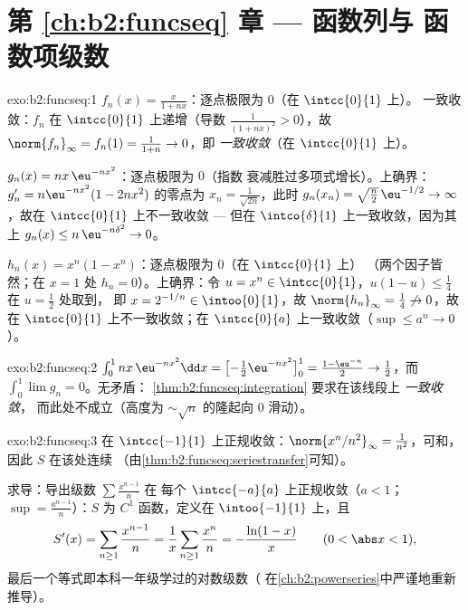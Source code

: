 \section*{第 \ref{ch:b2:funcseq} 章 --- 函数列与
函数项级数}

\begin{solution}{exo:b2:funcseq:1}
$f_n(x) = \frac{x}{1 + nx}$：逐点极限为 $0$（在 $\intcc{0}{1}$ 上）。
一致收敛：$f_n$ 在 $\intcc{0}{1}$ 上递增（导数
$\frac{1}{(1+nx)^2} > 0$），故 $\norm{f_n}_\infty = f_n(1) =
\frac{1}{1+n} \to 0$，即 \emph{一致收敛}（在 $\intcc{0}{1}$ 上）。

$g_n(x) = nx\,\eu^{-nx^2}$：逐点极限为 $0$（指数
衰减胜过多项式增长）。上确界：$g_n' = n\eu^{-nx^2}(1 - 2nx^2)$ 的零点为 $x_n =
\frac{1}{\sqrt{2n}}$，此时 $g_n(x_n) = \sqrt{\frac n2}\,\eu^{-1/2}
\to \infty$，故在 $\intcc{0}{1}$ 上不一致收敛 --- 但在
$\intco{\delta}{1}$ 上一致收敛，因为其上 $g_n(x) \leq n\,\eu^{-n\delta^2}
\to 0$。

$h_n(x) = x^n(1 - x^n)$：逐点极限为 $0$（在 $\intcc{0}{1}$ 上）
（两个因子皆然；在 $x = 1$ 处 $h_n = 0$）。上确界：令 $u = x^n \in
\intcc{0}{1}$，$u(1-u) \leq \frac14$ 在 $u = \frac12$ 处取到，
即 $x = 2^{-1/n} \in \intoo{0}{1}$，故 $\norm{h_n}_\infty =
\frac14 \not\to 0$，故在 $\intcc{0}{1}$ 上不一致收敛；在
$\intcc{0}{a}$ 上一致收敛（$\sup \leq a^n \to 0$）。
\end{solution}

\begin{solution}{exo:b2:funcseq:2}
$\int_0^1 nx\,\eu^{-nx^2}\dd x = \bigl[-\tfrac12
\eu^{-nx^2}\bigr]_0^1 = \frac{1 - \eu^{-n}}{2} \to \frac12$，而
$\int_0^1 \lim g_n = 0$。无矛盾：
\cref{thm:b2:funcseq:integration} 要求在该线段上 \emph{一致收敛}，
而此处不成立（高度为
$\sim\sqrt n$ 的隆起向 $0$ 滑动）。
\end{solution}

\begin{solution}{exo:b2:funcseq:3}
在 $\intcc{-1}{1}$ 上正规收敛：$\norm{x^n/n^2}_\infty =
\frac{1}{n^2}$，可和，因此 $S$ 在该处连续
（由\cref{thm:b2:funcseq:seriestransfer}可知）。

求导：导出级数 $\sum \frac{x^{n-1}}{n}$ 在
每个 $\intcc{-a}{a}$ 上正规收敛（$a < 1$；$\sup =
\frac{a^{n-1}}{n}$）：$S$ 为 $C^1$ 函数，定义在 $\intoo{-1}{1}$ 上，且
\[
S'(x) = \sum_{n\geq1} \frac{x^{n-1}}{n} = \frac1x \sum_{n\geq1}
\frac{x^n}{n} = -\frac{\ln(1 - x)}{x}
\qquad (0 < \abs x < 1),
\]
最后一个等式即本科一年级学过的对数级数（
在\cref{ch:b2:powerseries}中严谨地重新推导）。
\end{solution}

